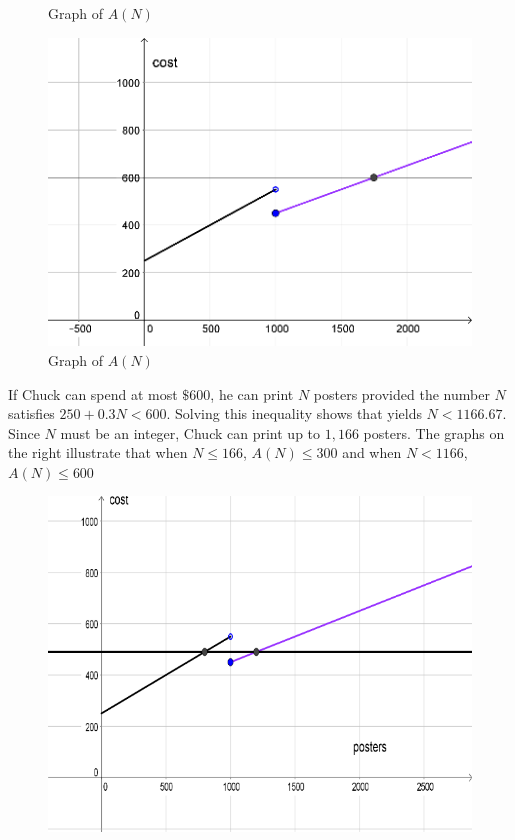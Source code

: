 \documentclass[10pt,]{book}
\theoremstyle{ptxdefinitionnotitle}
\theoremstyle{ptxdefinitiontitle}
\numberwithin{equation}{section}
\newcommand{\lt}{<}
\begin{document}
\begin{example}
\begin{enumerate}[label=\alph*)]
\begin{figure}
\caption{Graph of \(A(N)\)\label{figure-2}}
\end{figure}
\begin{figure}
\centering
\includegraphics[width=1\linewidth]{./src/images/chapter02/chapter02section01-example01-solutiona-graph2.png}
\caption{Graph of \(A(N)\)\label{figure-3}}
\end{figure}
\hypertarget{p-12}{}%
If Chuck can spend at most \(\$600\), he can print \(N\) posters provided the number \(N\) satisfies \(250 + 0.3N \lt 600\). Solving this inequality shows that yields \(N \lt 1166.67\).  Since \(N\) must be an integer, Chuck can print up to \(1,166\) posters. The graphs on the right illustrate that when \(N \leq 166\), \(A(N) \leq 300\) and when \(N \lt 1166\), \(A(N) \leq 600\)%
\begin{figure}
\centering
\includegraphics[width=1\linewidth]{./src/images/chapter02/chapter02section01-example01-solutionb-graph.png}

\end{figure}
\end{enumerate}
\end{example}
\end{document}

